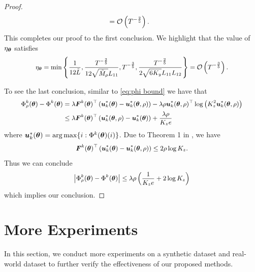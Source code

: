 \begin{proof}
\begin{equation}
\begin{aligned}
			& = \mathcal{O}\left(T^{-\frac{2}{5}}\right). 
		\end{aligned}
	\end{equation}
	This completes our proof to the first conclusion. We highlight that the value of $\eta_{\text{\boldmath{$\theta$}}}$ satisfies
	\begin{equation}
		\small
		\eta_{\btheta} = \min\left\{\frac{1}{12\tilde{L}}, \frac{T^{-\frac{2}{5}}}{12\sqrt{\tilde{M}_{\rho}}L_{11}}, T^{-\frac{3}{5}}, \frac{ T^{-\frac{2}{5}}}{2\sqrt{6K_{y}}L_{11}L_{12}}\right\} = \cO\left(T^{-\frac{3}{5}}\right). 
	\end{equation}
	\par
	To see the last conclusion, similar to \eqref{eq:phi bound} we have that
	\begin{equation}
		\small
		\begin{aligned}
			\Phi_{\rho}^{k}(\btheta) - \Phi^{k}(\btheta) & = \lambda\bF^{k}(\btheta)^{\top}\left(\bu_{k}^{*}(\btheta) - \bu_{k}^{*}(\btheta, \rho)\right) - \lambda\rho\bu_{k}^{*}(\btheta, \rho)^{\top}\log{\left(K_{z}^{2}\bu_{k}^{*}(\btheta, \rho)\right)} \\
			& \leq \lambda\bF^{k}(\btheta)^{\top}\left(\bu_{k}^{*}(\btheta, \rho) - \bu_{k}^{*}(\btheta)\right) + \frac{\lambda\rho}{K_{z}e}
		\end{aligned} 
	\end{equation}
	where $\boldsymbol{u}_{k}^{*}(\text{\boldmath{$\theta$}}) = \arg\max\{i: \Phi^{k}(\text{\boldmath{$\theta$}})(i)\}$. Due to Theorem 1 in \citep{epasto2020optimal}, we have 
	\begin{equation}
		\small
		\bF^{k}(\btheta)^{\top}\left(\bu_{k}^{*}(\btheta) - \bu_{k}^{*}(\btheta, \rho)\right) \leq 2\rho\log{K_{z}}.
	\end{equation}
	Thus we can conclude 
	\begin{equation}
		\small
		\left|\Phi_{\rho}^{k}(\btheta) - \Phi^{k}(\btheta)\right| \leq \lambda\rho\left(\frac{1}{K_{z}e} + 2\log{K_{z}}\right)
	\end{equation}
	which implies our conclusion. 
\end{proof}
\section{More Experiments}\label{app:experiments}
In this section, we conduct more experiments on a synthetic dataset and real-world dataset to further verify the effectiveness of our proposed methods.  
